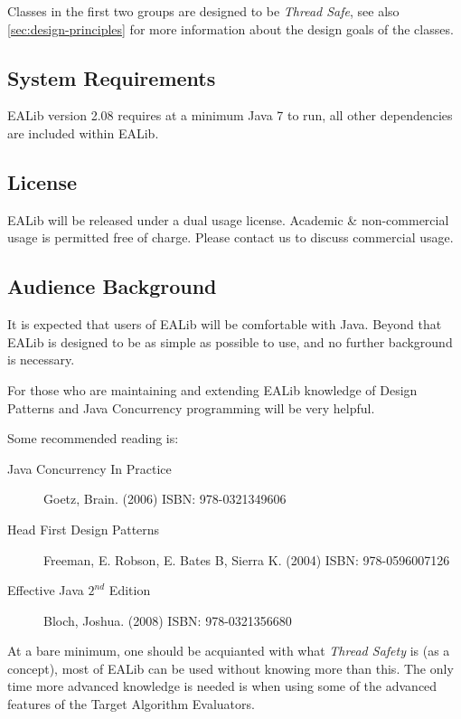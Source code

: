 \documentclass[11pt,letterpaper,oneside]{article}
\begin{document}
Classes in the first two groups are designed to be \emph{Thread Safe}, see also \ref{sec:design-principles} for more information about the design goals of the classes.

\subsection{System Requirements}

EALib version 2.08 requires at a minimum Java 7 to run, all other dependencies are included within EALib.

\subsection{License}

EALib will be released under a dual usage license. Academic \& non-commercial usage is permitted free of charge. Please contact us to discuss commercial usage.

\subsection{Audience Background}

It is expected that users of EALib will be comfortable with Java.  Beyond that EALib is designed to be as simple as possible to use, and no further background is necessary. 

For those who are maintaining and extending EALib knowledge of Design Patterns and Java Concurrency programming will be very helpful.

Some recommended reading is:

\begin{description}

\item[Java Concurrency In Practice] Goetz, Brain. (2006) ISBN: 978-0321349606

\item[Head First Design Patterns] Freeman, E. Robson, E. Bates B, Sierra K. (2004) ISBN: 978-0596007126

\item[Effective Java $2^{nd}$ Edition] Bloch, Joshua. (2008) ISBN: 978-0321356680 
\end{description}

At a bare minimum, one should be acquianted with what \emph{Thread Safety} is (as a concept), most of EALib can be used without knowing more than this. The only time more advanced knowledge is needed is when using some of the advanced features of the Target Algorithm Evaluators.
\end{document}

